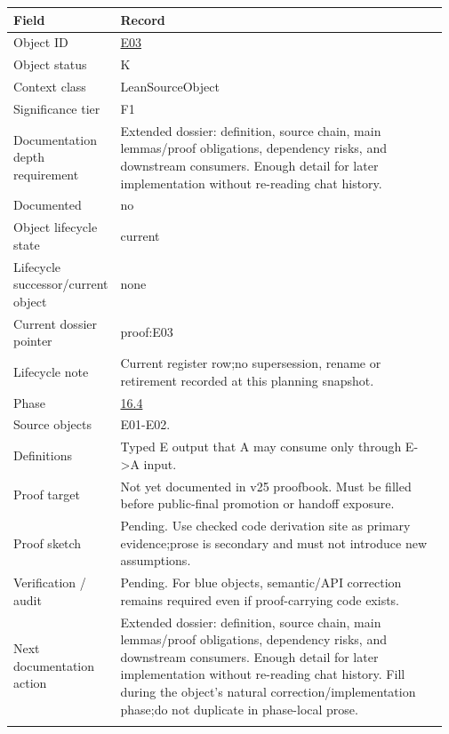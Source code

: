 \begin{longtable}{L{0.16\linewidth} L{0.81\linewidth}}
\hline
\textbf{Field} & \textbf{Record}\\
\hline
Object ID & \hyperlink{object-row-E03}{E03}\\
\hline\addlinespace[0.20em]
Object status & K\\
\hline\addlinespace[0.20em]
Context class & LeanSourceObject\\
\hline\addlinespace[0.20em]
Significance tier & F1\\
\hline\addlinespace[0.20em]
Documentation depth requirement & Extended dossier: definition, source chain, main lemmas/\allowbreak{}proof obligations, dependency risks, and downstream consumers. Enough detail for later implementation without re-reading chat history.\\
\hline\addlinespace[0.20em]
Documented & no\\
\hline\addlinespace[0.20em]
Object lifecycle state & current\\
\hline\addlinespace[0.20em]
Lifecycle successor/\allowbreak{}current object & none\\
\hline\addlinespace[0.20em]
Current dossier pointer & proof:E03\\
\hline\addlinespace[0.20em]
Lifecycle note & Current register row;\newline no supersession, rename or retirement recorded at this planning snapshot.\\
\hline\addlinespace[0.20em]
Phase & \hyperlink{phase-row-16-4}{16.4}\\
\hline\addlinespace[0.20em]
Source objects & E01-E02.\\
\hline\addlinespace[0.20em]
Definitions & Typed E output that A may consume only through E->A input.\\
\hline\addlinespace[0.20em]
Proof target & Not yet documented in v25 proofbook. Must be filled before public-final promotion or handoff exposure.\\
\hline\addlinespace[0.20em]
Proof sketch & Pending. Use checked code derivation site as primary evidence;\newline prose is secondary and must not introduce new assumptions.\\
\hline\addlinespace[0.20em]
Verification /\allowbreak{} audit & Pending. For blue objects, semantic/\allowbreak{}API correction remains required even if proof-carrying code exists.\\
\hline\addlinespace[0.20em]
Next documentation action & Extended dossier: definition, source chain, main lemmas/\allowbreak{}proof obligations, dependency risks, and downstream consumers. Enough detail for later implementation without re-reading chat history. Fill during the object's natural correction/\allowbreak{}implementation phase;\newline do not duplicate in phase-local prose.\\
\hline\addlinespace[0.20em]
\end{longtable}
